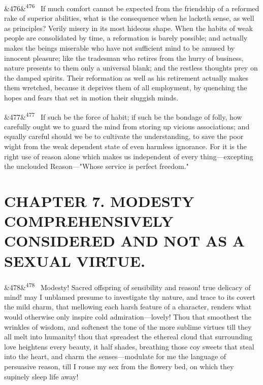 \documentclass[12pt]{article}
\newcommand{\para}[1][]{\par\noindent\ifx&#1&\else\textsuperscript{\footnotesize #1}~\fi}
\begin{document}
\para[476] If much comfort cannot be expected from the friendship of a reformed rake of superior abilities, what is the consequence when he lacketh sense, as well as principles? Verily misery in its most hideous shape. When the habits of weak people are consolidated by time, a reformation is barely possible; and actually makes the beings miserable who have not sufficient mind to be amused by innocent pleasure; like the tradesman who retires from the hurry of business, nature presents to them only a universal blank; and the restless thoughts prey on the damped spirits. Their reformation as well as his retirement actually makes them wretched, because it deprives them of all employment, by quenching the hopes and fears that set in motion their sluggish minds.

\para[477] If such be the force of habit; if such be the bondage of folly, how carefully ought we to guard the mind from storing up vicious associations; and equally careful should we be to cultivate the understanding, to save the poor wight from the weak dependent state of even harmless ignorance. For it is the right use of reason alone which makes us independent of every thing---excepting the unclouded Reason---"Whose service is perfect freedom."

\section*{CHAPTER 7. MODESTY COMPREHENSIVELY CONSIDERED AND NOT AS A SEXUAL VIRTUE.}

\para[478] Modesty! Sacred offspring of sensibility and reason! true delicacy of mind! may I unblamed presume to investigate thy nature, and trace to its covert the mild charm, that mellowing each harsh feature of a character, renders what would otherwise only inspire cold admiration---lovely! Thou that smoothest the wrinkles of wisdom, and softenest the tone of the more sublime virtues till they all melt into humanity! thou that spreadest the ethereal cloud that surrounding love heightens every beauty, it half shades, breathing those coy sweets that steal into the heart, and charm the senses---modulate for me the language of persuasive reason, till I rouse my sex from the flowery bed, on which they supinely sleep life away!
\end{document}
